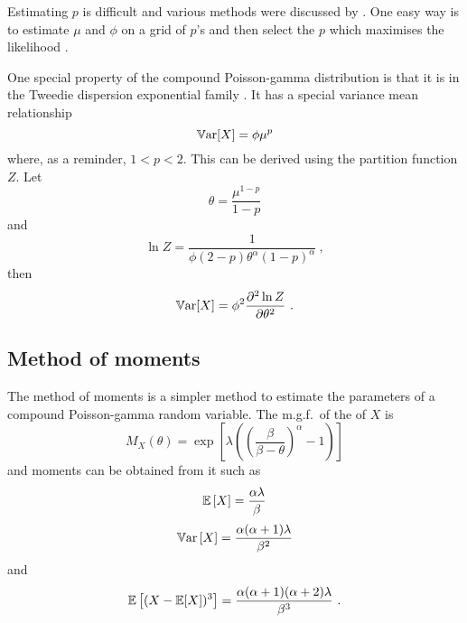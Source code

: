 Estimating $p$ is difficult and various methods were discussed by \cite{zhang2013likelihood}. One easy way is to estimate $\mu$ and $\phi$ on a grid of $p$'s and then select the $p$ which maximises the likelihood \citep{dunn2005series}.

One special property of the compound Poisson-gamma distribution is that it is in the Tweedie dispersion exponential family \citep{jorgensen1987exponential}. It has a special variance mean relationship
\begin{equation}
  \operatorname{\mathbb{V}ar}[X] = \phi \mu^p
\end{equation}
where, as a reminder, $1<p<2$. This can be derived using the partition function $Z$. Let
\begin{equation}
  \theta = \frac{\mu^{1-p}}{1-p}
\end{equation}
and
\begin{equation}
  \ln Z = \frac{1}{\phi(2-p)\theta^\alpha(1-p)^\alpha} \ ,
\end{equation}
then
\begin{equation}
  \operatorname{\mathbb{V}ar}[X] = \phi^2 \frac{\partial^2\ln Z}{\partial\theta^2} \ .
\end{equation}

\subsection{Method of moments}

The method of moments is a simpler method to estimate the parameters of a compound Poisson-gamma random variable. The m.g.f.~of the of $X$ is
\begin{equation}
  M_X(\theta)=\exp\left[\lambda\left(\left(\frac{\beta}{\beta-\theta}\right)^{\alpha}-1\right)\right]
\end{equation}
and moments can be obtained from it such as
\begin{equation}
  \operatorname{\mathbb{E}}\left[X\right]=\frac{\alpha\lambda}{\beta}
\end{equation}
\begin{equation}
  \operatorname{\mathbb{V}ar}\left[X\right]=\frac{\alpha(\alpha+1)\lambda}{\beta^2}
  \label{eq:compoundPoisson_variance}
\end{equation}
and
\begin{equation}
  \operatorname{\mathbb{E}}\left[(X-\operatorname{\mathbb{E}}[X])^3\right] = \frac{\alpha(\alpha+1)(\alpha+2)\lambda}{\beta^3}
  \ .
\end{equation}

